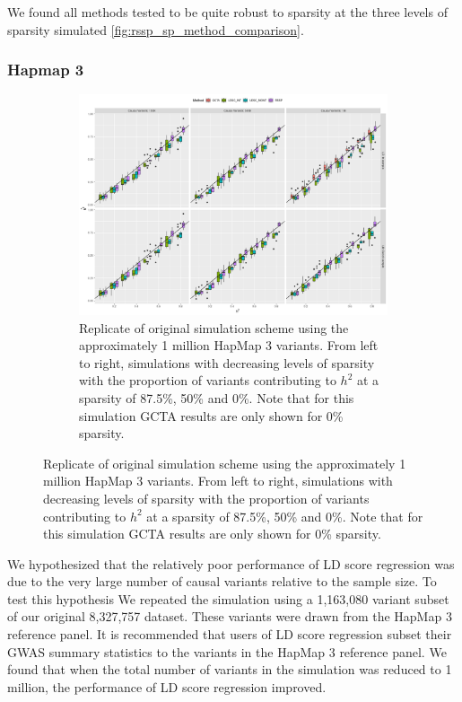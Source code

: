 We found all methods tested to be quite robust to sparsity at the three levels of sparsity simulated \ref{fig:rssp_sp_method_comparison}.  


\subsubsection{Hapmap 3}\label{sec:org0fa2c7f}

\begin{figure}
  \centering
  \begin{subfigure}[t]{\textwidth}
    \centering
    \includegraphics[width=.9\linewidth]{img/rssp_hm3.png}
    \caption{Replicate of original simulation scheme using the approximately 1 million HapMap 3  variants.  From left to right, simulations with decreasing levels of sparsity with the proportion of variants contributing to $h^2$ at a sparsity of 87.5\%, 50\% and 0\%.  Note that for this simulation GCTA results are only shown for 0\% sparsity. }\label{fig:rssp_hm3}
  \end{subfigure}
\end{figure}



We hypothesized that the relatively poor performance of LD score regression was due to the very large number of causal variants relative to the sample size.  To test this hypothesis  We repeated the simulation using a 1,163,080 variant subset of our original 8,327,757 dataset.  These variants were drawn from the HapMap 3 reference panel\cite{hapmap3}.  It is recommended that users of LD score regression subset their GWAS summary statistics to the variants in the HapMap 3 reference panel\cite{ldsc}.  We found that when the total number of variants in the simulation was reduced to 1 million, the performance of LD score regression improved.  


